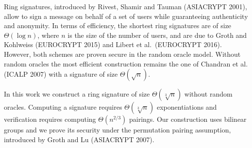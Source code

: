 Ring signatures, introduced by Rivest, Shamir and Tauman (ASIACRYPT 2001), allow to sign a message on behalf of a set of users while guaranteeing authenticity and anonymity. In terms of efficiency, the shortest ring signatures are of size $\Theta(\log n)$, where $n$ is the size of the  number of users, and are due to Groth and Kohlweiss (EUROCRYPT 2015) and Libert et al.~(EUROCRYPT 2016). However, both schemes are proven secure in the random oracle model. Without random oracles the most efficient construction remains the one of Chandran et al. (ICALP 2007) with a signature of size $\Theta(\sqrt{n})$.

In this work we construct a ring signature of size $\Theta(\sqrt[3]{n})$ without random oracles. Computing a signature requires $\Theta(\sqrt[3]{n})$ exponentiations and verification requires computing $\Theta(n^{2/3})$ pairings. Our construction uses bilinear groups and we prove its security under the permutation pairing assumption, introduced by Groth and Lu (ASIACRYPT 2007).
